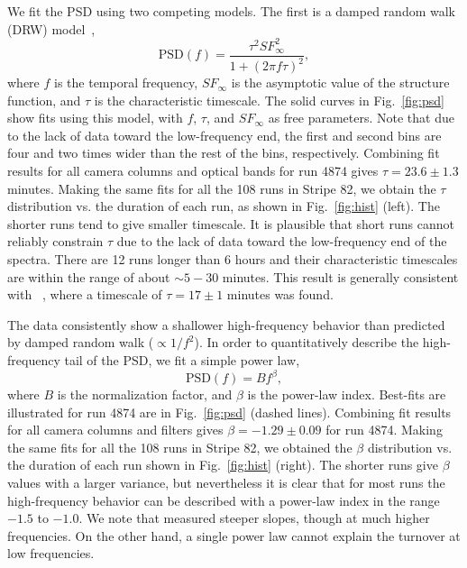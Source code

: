 We fit the PSD using two competing models.
The first is a damped random walk (DRW) model~\citep[for introduction see Chapter 10 in][]{zeljkoBook},
\begin{equation}
\textrm{PSD}(f) = \frac{\tau^2 SF^2_{\infty}}{1+(2\pi f \tau)^2},
\end{equation}
where $f$ is the temporal frequency, $SF_{\infty}$ is the asymptotic
value of the structure function, and $\tau$ is the
characteristic timescale.
The solid curves in Fig.~\ref{fig:psd} show fits using this model,
with $f$, $\tau$, and $SF_{\infty}$ as free parameters.
Note that due to the lack of data toward the low-frequency end, the
first and second bins are four and two times wider than the
rest of the bins, respectively.
Combining fit results for all camera columns and optical bands for run 4874
gives $\tau = 23.6 \pm 1.3$ minutes.
Making the same fits for all the 108 runs in Stripe 82, 
we obtain the $\tau$ distribution vs. the duration of each
run, as shown in Fig.~\ref{fig:hist} (left).
The shorter runs tend to give smaller timescale. It is plausible that short runs 
cannot reliably constrain $\tau$ due to the lack of data toward the low-frequency 
end of the spectra. There are 12 runs longer than 6 hours and their characteristic timescales
are within the range of about $\sim5-30$ minutes.
This result is generally consistent with ~\cite{Racine1996}, where a timescale of 
$\tau = 17 \pm 1$ minutes was found.

The data consistently show a shallower high-frequency behavior than predicted
by damped random walk ($\propto 1/f^2$). In order to quantitatively describe 
the high-frequency tail of the PSD, we fit a simple power law,
\begin{equation}
\textrm{PSD}(f) = B f^\beta,
\end{equation}
where $B$ is the normalization factor, and $\beta$ is the power-law index.
Best-fits are illustrated for run 4874 are in Fig.~\ref{fig:psd} (dashed lines).
Combining fit results for all camera columns and filters gives $\beta = -1.29\pm 0.09$ 
for run 4874. Making the same fits for all the 108 runs in Stripe 82, we obtained the 
$\beta$ distribution vs. the duration of each run shown in Fig.~\ref{fig:hist} (right).
The shorter runs give $\beta$ values with a larger variance, but nevertheless it is 
clear that for most runs the high-frequency behavior can be described with a 
power-law index in the range $-1.5$ to $-1.0$. 
We note that \cite{2016SPIE.9906E..42S} measured steeper slopes,
though at much higher frequencies.
On the other hand, a single 
power law cannot explain the turnover at low frequencies. 

